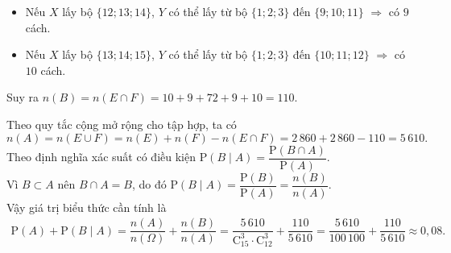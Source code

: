 \begin{ex}
{\begin{itemize}
\begin{itemize}
				\item Nếu $X$ lấy bộ $\{12;13;14\}$, $Y$ có thể lấy từ bộ $\{1;2;3\}$ đến $\{9;10;11\}$ $\Rightarrow$ có $9$ cách.
				\item Nếu $X$ lấy bộ $\{13;14;15\}$, $Y$ có thể lấy từ bộ $\{1;2;3\}$ đến $\{10;11;12\}$ $\Rightarrow$ có $10$ cách.
			\end{itemize}
			Suy ra $n(B) = n(E \cap F) = 10 + 9 + 72 + 9 + 10 = 110$.
		\end{itemize}
		Theo quy tắc cộng mở rộng cho tập hợp, ta có
		\[ n(A) = n(E \cup F) = n(E) + n(F) - n(E \cap F) = 2\,860 + 2\,860 - 110 = 5\,610. \]
		Theo định nghĩa xác suất có điều kiện $\mathrm{P}(B \mid A) = \dfrac{\mathrm{P}(B \cap A)}{\mathrm{P}(A)}$.\\
		Vì $B \subset A$ nên $B \cap A = B$, do đó $\mathrm{P}(B \mid A) = \dfrac{\mathrm{P}(B)}{\mathrm{P}(A)} = \dfrac{n(B)}{n(A)}$.\\
		Vậy giá trị biểu thức cần tính là
		\allowdisplaybreaks
		\begin{align*}
			\mathrm{P}(A) + \mathrm{P}(B\mid A) = \dfrac{n(A)}{n(\Omega)} + \dfrac{n(B)}{n(A)} 
			= \dfrac{5\,610}{\mathrm{C}_{15}^3 \cdot \mathrm{C}_{12}^3} + \dfrac{110}{5\,610}
			= \dfrac{5\,610}{100\,100} + \dfrac{110}{5\,610} \approx 0{,}08.
		\end{align*}
	}
\end{ex}


